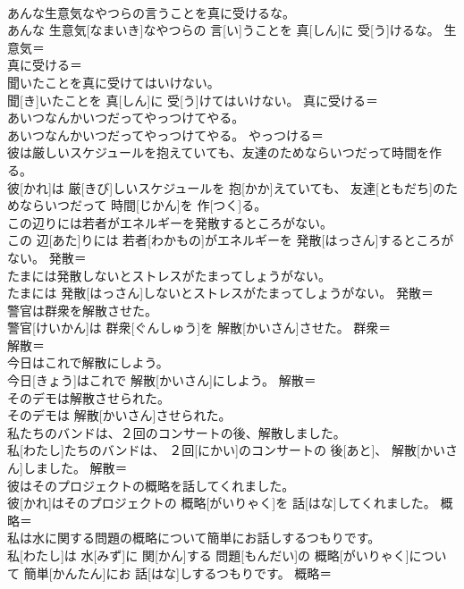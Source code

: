 \documentclass[8pt]{extreport}
\begin{document}
\begin{CJK}{UTF8}{min}
\\	あんな生意気なやつらの言うことを真に受けるな。	
\\	あんな 生意気[なまいき]なやつらの 言[い]うことを 真[しん]に 受[う]けるな。	生意気＝ 
\\	真に受ける＝ 
\\	聞いたことを真に受けてはいけない。	
\\	聞[き]いたことを 真[しん]に 受[う]けてはいけない。	真に受ける＝ 
\\	あいつなんかいつだってやっつけてやる。	
\\	あいつなんかいつだってやっつけてやる。	やっつける＝ 
\\	彼は厳しいスケジュールを抱えていても、友達のためならいつだって時間を作る。	
\\	彼[かれ]は 厳[きび]しいスケジュールを 抱[かか]えていても、 友達[ともだち]のためならいつだって 時間[じかん]を 作[つく]る。	
\\	この辺りには若者がエネルギーを発散するところがない。	
\\	この 辺[あた]りには 若者[わかもの]がエネルギーを 発散[はっさん]するところがない。	発散＝ 
\\	たまには発散しないとストレスがたまってしょうがない。	
\\	たまには 発散[はっさん]しないとストレスがたまってしょうがない。	発散＝ 
\\	警官は群衆を解散させた。	
\\	警官[けいかん]は 群衆[ぐんしゅう]を 解散[かいさん]させた。	群衆＝ 
\\	解散＝ 
\\	今日はこれで解散にしよう。	
\\	今日[きょう]はこれで 解散[かいさん]にしよう。	解散＝ 
\\	そのデモは解散させられた。	
\\	そのデモは 解散[かいさん]させられた。	
\\	私たちのバンドは、２回のコンサートの後、解散しました。	
\\	私[わたし]たちのバンドは、 ２回[にかい]のコンサートの 後[あと]、 解散[かいさん]しました。	解散＝ 
\\	彼はそのプロジェクトの概略を話してくれました。	
\\	彼[かれ]はそのプロジェクトの 概略[がいりゃく]を 話[はな]してくれました。	概略＝ 
\\	私は水に関する問題の概略について簡単にお話しするつもりです。	
\\	私[わたし]は 水[みず]に 関[かん]する 問題[もんだい]の 概略[がいりゃく]について 簡単[かんたん]にお 話[はな]しするつもりです。	概略＝ 

\end{CJK}
\end{document}
